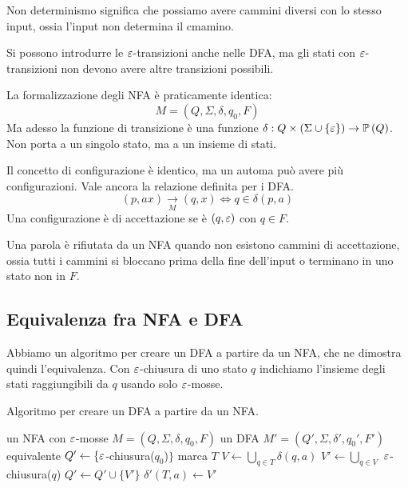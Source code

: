 Non determinismo significa che possiamo avere cammini diversi con lo stesso input, ossia l'input non determina il cmamino.

Si possono introdurre le $\varepsilon$-transizioni anche nelle DFA, ma gli stati con $\varepsilon$-transizioni non devono avere altre transizioni possibili.

La formalizzazione degli NFA \`e praticamente identica:
\[
	M = (Q, \Sigma, \delta, q_0, F)
\]
Ma adesso la funzione di transizione \`e una funzione $\delta : Q \times \left( \Sigma \cup \{ \varepsilon \} \right) \to \mathbb{P} \left( {Q} \right)$.
Non porta a un singolo stato, ma a un insieme di stati.

Il concetto di configurazione \`e identico, ma un automa pu\`o avere pi\`u configurazioni.
Vale ancora la relazione definita per i DFA.
\[
	(p, ax) \underset{M}{\to} (q,x) \iff q \in \delta(p,a)
\]
Una configurazione \`e di accettazione se \`e $(q, \varepsilon)$ con $q \in F$.

Una parola \`e rifiutata da un NFA quando non esistono cammini di accettazione, ossia tutti i cammini si bloccano prima della fine dell'input o terminano in uno stato non in $F$.

\subsection{Equivalenza fra NFA e DFA}

Abbiamo un algoritmo per creare un DFA a partire da un NFA, che ne dimostra quindi l'equivalenza.
Con $\varepsilon$-chiusura di uno stato $q$ indichiamo l'insieme degli stati raggiungibili da $q$ usando solo $\varepsilon$-mosse.

\begin{algorithm}
	\label{alg:algoritmo_dfa_eq_nfa}
	\caption{Algoritmo per creare un DFA a partire da un NFA.}
	\begin{algorithmic}
		\Require un NFA con $\varepsilon$-mosse $M = (Q, \Sigma, \delta, q_0, F)$
		\Ensure un DFA $M' = (Q', \Sigma, \delta', q_0', F')$ equivalente
		\State $Q' \gets \{ \varepsilon$-chiusura($q_0$)$\}$
			\State marca $T$
				\State $V \gets \bigcup_{q \in T} \delta(q, a)$
				\State $V' \gets \bigcup_{q \in V}$ $\varepsilon$-chiusura($q$)
				\State $Q' \gets Q' \cup \{ V' \}$
				\EndIf
				\State $\delta'(T, a) \gets V'$
			\EndFor
		\EndWhile
	\end{algorithmic}
\end{algorithm}

